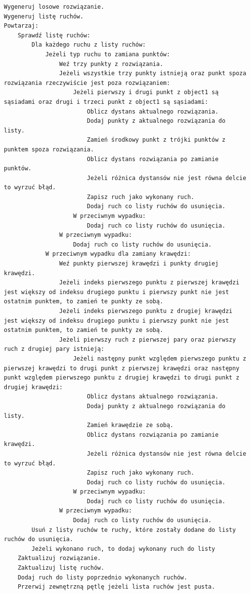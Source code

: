 \documentclass[a4paper]{article}
\begin{document}
\begin{lstlisting}
Wygeneruj losowe rozwiązanie.
Wygeneruj listę ruchów.
Powtarzaj:
    Sprawdź listę ruchów:
        Dla każdego ruchu z listy ruchów:
            Jeżeli typ ruchu to zamiana punktów:
                Weź trzy punkty z rozwiązania.
                Jeżeli wszystkie trzy punkty istnieją oraz punkt spoza rozwiązania rzeczywiście jest poza rozwiązaniem:
                    Jeżeli pierwszy i drugi punkt z object1 są sąsiadami oraz drugi i trzeci punkt z object1 są sąsiadami:
                        Oblicz dystans aktualnego rozwiązania.
                        Dodaj punkty z aktualnego rozwiązania do listy.
                        Zamień środkowy punkt z trójki punktów z punktem spoza rozwiązania.
                        Oblicz dystans rozwiązania po zamianie punktów.
                        Jeżeli różnica dystansów nie jest równa delcie to wyrzuć błąd.
                        Zapisz ruch jako wykonany ruch.
                        Dodaj ruch co listy ruchów do usunięcia.
                    W przeciwnym wypadku:
                        Dodaj ruch co listy ruchów do usunięcia.
                W przeciwnym wypadku:
                    Dodaj ruch co listy ruchów do usunięcia.
            W przeciwnym wypadku dla zamiany krawędzi:
                Weź punkty pierwszej krawędzi i punkty drugiej krawędzi.
                Jeżeli indeks pierwszego punktu z pierwszej krawędzi jest większy od indeksu drugiego punktu i pierwszy punkt nie jest ostatnim punktem, to zamień te punkty ze sobą.
                Jeżeli indeks pierwszego punktu z drugiej krawędzi jest większy od indeksu drugiego punktu i pierwszy punkt nie jest ostatnim punktem, to zamień te punkty ze sobą.
                Jeżeli pierwszy ruch z pierwszej pary oraz pierwszy ruch z drugiej pary istnieją:
                    Jeżeli następny punkt względem pierwszego punktu z pierwszej krawędzi to drugi punkt z pierwszej krawędzi oraz następny punkt względem pierwszego punktu z drugiej krawędzi to drugi punkt z drugiej krawędzi:
                        Oblicz dystans aktualnego rozwiązania.
                        Dodaj punkty z aktualnego rozwiązania do listy.
                        Zamień krawędzie ze sobą.
                        Oblicz dystans rozwiązania po zamianie krawędzi.
                        Jeżeli różnica dystansów nie jest równa delcie to wyrzuć błąd.
                        Zapisz ruch jako wykonany ruch.
                        Dodaj ruch co listy ruchów do usunięcia.
                    W przeciwnym wypadku:
                        Dodaj ruch co listy ruchów do usunięcia.
                W przeciwnym wypadku:
                    Dodaj ruch co listy ruchów do usunięcia.
        Usuń z listy ruchów te ruchy, które zostały dodane do listy ruchów do usunięcia.
        Jeżeli wykonano ruch, to dodaj wykonany ruch do listy
    Zaktualizuj rozwiązanie.
    Zaktualizuj listę ruchów.
    Dodaj ruch do listy poprzednio wykonanych ruchów.
    Przerwij zewnętrzną pętlę jeżeli lista ruchów jest pusta.
\end{lstlisting}
\end{document}
